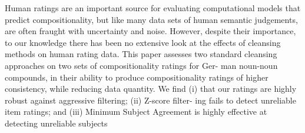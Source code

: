 Human ratings are an important source for evaluating computational models that predict compositionality, but like many data sets of human semantic judgements,
 are often fraught with uncertainty and noise. However, despite their
 importance, to our knowledge there has been no extensive look at the effects of
 cleansing methods on human rating data. This paper assesses two standard
 cleansing approaches on two sets of compositionality ratings for Ger- man
 noun-noun compounds, in their ability to produce compositionality ratings of
 higher consistency, while reducing data quantity. We find (i) that our ratings
 are highly robust against aggressive filtering; (ii) Z-score filter- ing fails
 to detect unreliable item ratings; and (iii) Minimum Subject Agreement is
 highly effective at detecting unreliable subjects

